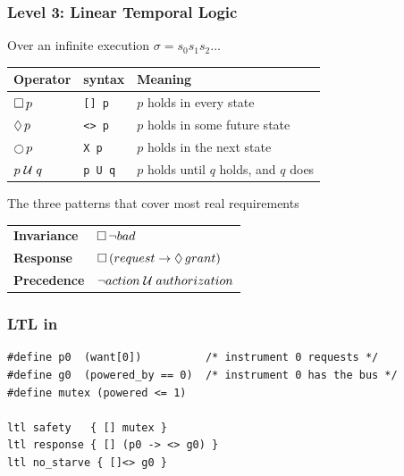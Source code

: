 \begin{frame}[fragile]
  \frametitle{Level 3: Linear Temporal Logic} \small

Over an infinite execution $\sigma = s_0 s_1 s_2 \ldots$

\vspace{0.3cm}

\begin{center}
\begin{tabular}{l l p{5.0cm}}
\toprule
{\bf Operator} & {\bf \spin{} syntax} & {\bf Meaning}\\
\midrule
$\Box\, p$          & \verb|[] p|      & $p$ holds in every state\\
$\Diamond\, p$         & \verb|<> p|      & $p$ holds in some future state\\
$\Next\, p$               & \verb|X p|       & $p$ holds in the next state\\
$p \;{\cal U}\; q$              & \verb|p U q|     & $p$ holds until $q$ holds, and $q$ does\\
\bottomrule
\end{tabular}
\end{center}

\pause
\vspace{0.4cm}

\begin{block}{The three patterns that cover most real requirements}\small
\begin{tabular}{l l}
{\bf Invariance} & $\Box\, \neg bad$ \\[0.1cm]
{\bf Response}   & $\Box\, (request \rightarrow \Diamond\, grant)$ \\[0.1cm]
{\bf Precedence} & $\neg action \;{\cal U}\; authorization$ \\
\end{tabular}
\end{block}

\end{frame}

\begin{frame}[fragile]
  \frametitle{LTL in \promelaname{}} \small

\begin{lstlisting}[language=promela]
#define p0  (want[0])          /* instrument 0 requests */
#define g0  (powered_by == 0)  /* instrument 0 has the bus */
#define mutex (powered <= 1)

ltl safety   { [] mutex }
ltl response { [] (p0 -> <> g0) }
ltl no_starve { []<> g0 }
\end{lstlisting}

\end{frame}

